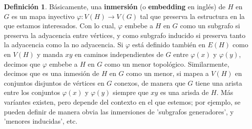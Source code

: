\documentclass[12pt]{report}
\theoremstyle{plain}
\theoremstyle{definition}
\newtheorem{definition}[theorem]{Definición}
\begin{document}
\begin{definition}
Básicamente, una \textbf{inmersión} (o \textbf{embedding} en inglés) de $H$ en $G$ es un mapa inyectivo $\varphi : V(H) \rightarrow V(G)$ tal que preserva la estructura en la que estamos interesados. Con lo cual, $\varphi$ embebe a $H$ en $G$ como un subgrafo si preserva la adyacencia entre vértices, y como subgrafo inducido si preserva tanto la adyacencia como la no adyacencia. Si $\varphi$ está definido también en $E(H)$ como en $V(H)$ y manda $xy$ en caminos independientes de $G$ entre $\varphi (x)$ y $\varphi (y)$, decimos que $\varphi$ embebe a $H$ en $G$ como un menor topológico. Similarmente, decimos que es una inmesión de $H$ en $G$ como un menor, si mapea a $V(H)$ en conjuntos disjuntos de vértices en $G$ conexos, de manera que $G$ tiene una arista entre los conjuntos $\varphi (x)$ y $\varphi (y)$ siempre que $xy$ es una arisda de $H$. Más varíantes existen, pero depende del contexto en el que estemos; por ejemplo, se pueden definir de manera obvia las inmersiones de 'subgrafos generadores', y 'menores inducidas', etc.
\end{definition}


\end{document}
